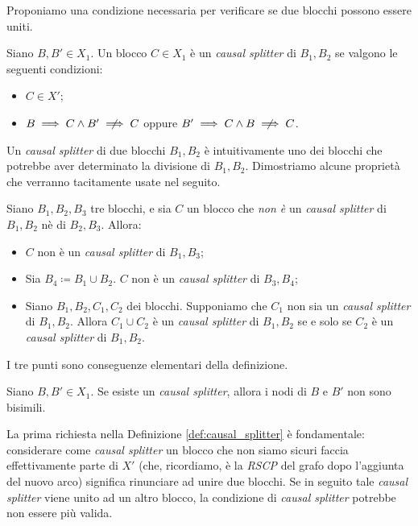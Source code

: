 Proponiamo una condizione necessaria per verificare se due blocchi possono essere uniti.

\begin{definition}
    \label{def:causal_splitter}
    Siano $B,B' \in X_1$. Un blocco $C \in X_1$ è un \emph{causal splitter} di $B_1,B_2$ se valgono le seguenti condizioni:
    \begin{itemize}
        \item $C \in X'$;
        \item $B \implies C \land B' \centernot\implies C$ oppure $B' \implies C \land B \centernot\implies C$.
    \end{itemize}
\end{definition}

Un \emph{causal splitter} di due blocchi $B_1,B_2$ è intuitivamente uno dei blocchi che potrebbe aver determinato la divisione di $B_1,B_2$. Dimostriamo alcune proprietà che verranno tacitamente usate nel seguito.

\begin{observation}
    Siano $B_1, B_2, B_3$ tre blocchi, e sia $C$ un blocco che \emph{non è} un \emph{causal splitter} di $B_1,B_2$ nè di $B_2,B_3$. Allora:
    \begin{itemize}
        \item $C$ non è un \emph{causal splitter} di $B_1,B_3$;
        \item Sia $B_4 \coloneqq B_1 \cup B_2$. $C$ non è un \emph{causal splitter} di $B_3, B_4$;
        \item Siano $B_1, B_2, C_1, C_2$ dei blocchi. Supponiamo che $C_1$ non sia un \emph{causal splitter} di $B_1,B_2$. Allora $C_1 \cup C_2$ è un \emph{causal splitter} di $B_1,B_2$ se e solo se $C_2$ è un \emph{causal splitter} di $B_1,B_2$.
    \end{itemize}
\end{observation}
\begin{proof2}
    I tre punti sono conseguenze elementari della definizione.
\end{proof2}

\begin{observation}
    Siano $B,B' \in X_1$. Se esiste un \emph{causal splitter}, allora i nodi di $B$ e $B'$ non sono bisimili.
\end{observation}

La prima richiesta nella Definizione \ref{def:causal_splitter} è fondamentale: considerare come \emph{causal splitter} un blocco che non siamo sicuri faccia effettivamente parte di $X'$ (che, ricordiamo, è la \emph{RSCP} del grafo dopo l'aggiunta del nuovo arco) significa rinunciare ad unire due blocchi. Se in seguito tale \emph{causal splitter} viene unito ad un altro blocco, la condizione di \emph{causal splitter} potrebbe non essere più valida.

